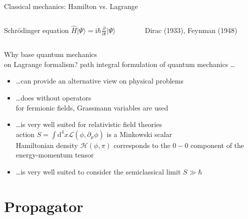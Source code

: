 \documentclass[t,dvipsnames]{beamer}
\begin{document}
\begin{frame}[t]{Classical mechanics: Hamilton vs. Lagrange}
\begin{columns}
\begin{column}[t]{0.5\textwidth}
\begin{center}
   Schrödinger equation $\hat H\vert\Psi\rangle =
	  \text{i}\hbar\frac{\partial}{\partial t}\vert\Psi\rangle$ 
   \end{center}
  \end{column}%
  \begin{column}[t]{0.5\textwidth}
   \begin{center}
    Dirac (1933), Feynman (1948)

    \vspace{0.2truecm}
   \end{center}
  \end{column}%
 \end{columns}
\end{frame}

\begin{frame}[c]{Why base quantum mechanics\\ on Lagrange formalism?}
 path integral formulation of quantum mechanics \ldots
 \begin{itemize}
  \item \ldots can provide an alternative view on physical problems
  \item \ldots does without operators\\
	for fermionic fields, Grassmann variables are used
  \item \ldots is very well suited for relativistic field theories\\[0.2truecm]
	action $S=\int\text{d}^4x\mathcal{L}(\phi, \partial_\mu\phi)$
		 is a Minkowski scalar\\[0.2truecm]
	Hamiltonian density $\mathcal{H}(\phi, \pi)$ corresponds to the
	$0-0$ component of the energy-momentum tensor
  \item \ldots is very well suited to consider the semiclassical limit
	$S\gg\hbar$
 \end{itemize}
\end{frame}

\section{Propagator}

\begin{frame}[c]{}
 \begin{center}
  \begin{minipage}{0.8\textwidth}
   \tableofcontents[currentsection]
  \end{minipage}
 \end{center}
\end{frame}
\end{document}
